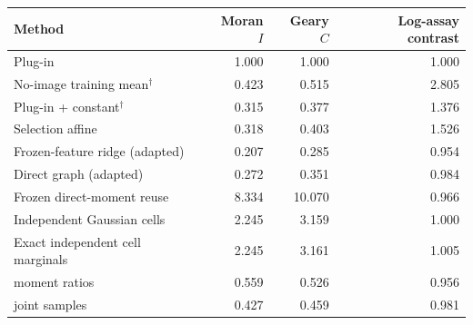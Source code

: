 
\begin{tabular}{@{}lrrr@{}}
\toprule
Method & Moran $I$ & Geary $C$ & Log-assay contrast \\
\midrule
Plug-in & 1.000 & 1.000 & 1.000 \\
No-image training mean$^\dagger$ & 0.423 & 0.515 & 2.805 \\
Plug-in + constant$^\dagger$ & 0.315 & 0.377 & 1.376 \\
Selection affine & 0.318 & 0.403 & 1.526 \\
Frozen-feature ridge (adapted) & 0.207 & 0.285 & 0.954 \\
Direct graph (adapted) & 0.272 & 0.351 & 0.984 \\
Frozen direct-moment reuse & 8.334 & 10.070 & 0.966 \\
Independent Gaussian cells & 2.245 & 3.159 & 1.000 \\
Exact independent cell marginals & 2.245 & 3.161 & 1.005 \\
\method{} moment ratios & 0.559 & 0.526 & 0.956 \\
\method{} joint samples & 0.427 & 0.459 & 0.981 \\
\bottomrule
\end{tabular}
